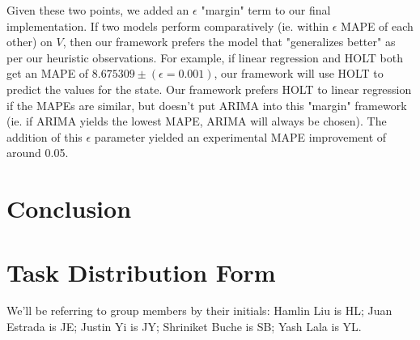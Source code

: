 \documentclass[sigconf,nonacm]{acmart}
\begin{document}
Given these two points, we added an $\epsilon$ "margin" term to our final
implementation. If two models perform comparatively (ie. within $\epsilon$ MAPE
of each other) on $V$, then our framework prefers the model that "generalizes
better" as per our heuristic observations. For example, if linear regression
and HOLT both get an MAPE of $8.675309 \pm (\epsilon = 0.001)$, our framework
will use HOLT to predict the values for the state. Our framework prefers HOLT
to linear regression if the MAPEs are similar, but doesn't put ARIMA into this
"margin" framework (ie. if ARIMA yields the lowest MAPE, ARIMA will always be
chosen). The addition of this $\epsilon$ parameter yielded an experimental 
MAPE improvement of around 0.05. 

\section{Conclusion}

\section{Task Distribution Form}

We'll be referring to group members by their initials: Hamlin Liu is HL; Juan
Estrada is JE; Justin Yi is JY; Shriniket Buche is SB; Yash Lala is YL. 
\end{document}
